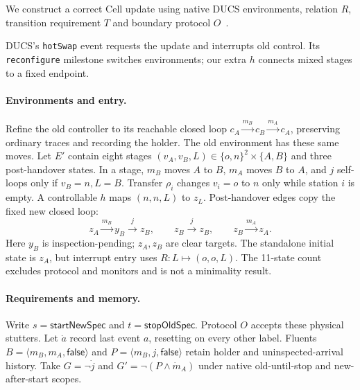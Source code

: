 We construct a correct Cell update using native DUCS environments, relation $R$, transition requirement $T$ and boundary protocol $O$~\cite[Defs.~4.1--4.3 and 5.1]{Nahabedian2020}.

DUCS's \texttt{hotSwap} event requests the update and interrupts old control. Its \texttt{reconfigure} milestone switches environments; our extra $h$ connects mixed stages to a fixed endpoint.

\paragraph{Environments and entry.}
Refine the old controller to its reachable closed loop $c_A\xrightarrow{m_B}c_B\xrightarrow{m_A}c_A$, preserving ordinary traces and recording the holder. The old environment has these same moves. Let $E'$ contain eight stages $(v_A,v_B,L)\in\{o,n\}^2\times\{A,B\}$ and three post-handover states. In a stage, $m_B$ moves $A$ to $B$, $m_A$ moves $B$ to $A$, and $j$ self-loops only if $v_B=n,L=B$. Transfer $\rho_i$ changes $v_i=o$ to $n$ only while station $i$ is empty. A controllable $h$ maps $(n,n,L)$ to $z_L$. Post-handover edges copy the fixed new closed loop:
\[
z_A\xrightarrow{m_B}y_B\xrightarrow{j}z_B,
\qquad z_B\xrightarrow{j}z_B,
\qquad z_B\xrightarrow{m_A}z_A.
\]
Here $y_B$ is inspection-pending; $z_A,z_B$ are clear targets. The standalone initial state is $z_A$, but interrupt entry uses $R:L\mapsto(o,o,L)$. The 11-state count excludes protocol and monitors and is not a minimality result.

\paragraph{Requirements and memory.}
Write $s=\mathsf{startNewSpec}$ and $t=\mathsf{stopOldSpec}$. Protocol $O$ accepts these physical stutters. Let $\dot a$ record last event $a$, resetting on every other label. Fluents $B=\langle m_B,m_A,\mathsf{false}\rangle$ and $P=\langle m_B,j,\mathsf{false}\rangle$ retain holder and uninspected-arrival history. Take $G=\neg\dot j$ and $G'=\neg(P\land\dot m_A)$ under native old-until-stop and new-after-start scopes.

